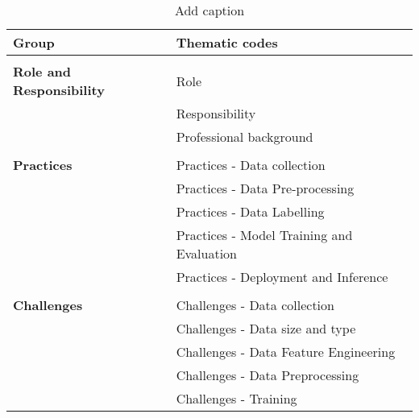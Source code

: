 \begin{table}[htbp]
  \centering
  \caption{Add caption}
    \begin{tabular}{rl}
    \hline
    \multicolumn{1}{l}{Group} & Thematic codes \\
    \hline
     & \\
    \multicolumn{1}{l}{\textbf{Role and Responsibility}} &
      Role \\
      &
      Responsibility
      \\
     &
      Professional background \\
    \hline
     & \\
    \multicolumn{1}{l}{\textbf{Practices}} &
      Practices - Data collection
      \\
     &
      Practices - Data Pre-processing
      \\
     &
      Practices - Data Labelling
      \\
     &
      Practices - Model Training and Evaluation
      \\
     &
      Practices - Deployment and Inference
      \bigstrut\\
    \hline
     &
      
      \bigstrut\\
    \multicolumn{1}{l}{\textbf{Challenges}} &
      Challenges - Data collection
      \\
     &
      Challenges - Data size and type
      \\
     &
      Challenges - Data Feature Engineering
      \\
     &
      Challenges - Data Preprocessing
      \\
     &
      Challenges - Training \\
    \hline
    \end{tabular}%
  \label{tab:coding}%
\end{table}%
